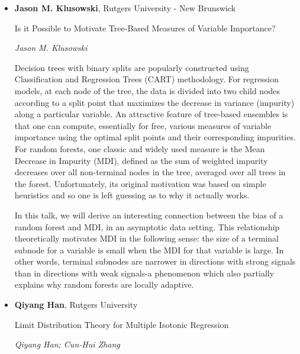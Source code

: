 \begin{itemize}
\item \textbf{Jason M. Klusowski}, Rutgers University - New Brunswick

Is it Possible to Motivate Tree-Based Measures of Variable Importance?

\emph{\footnotesize Jason M. Klusowski}

Decision trees with binary splits are popularly constructed using Classification and Regression Trees (CART) methodology. For regression models, at each node of the tree, the data is divided into two child nodes according to a split point that maximizes the decrease in variance (impurity) along a particular variable. An attractive feature of tree-based ensembles is that one can compute, essentially for free, various measures of variable importance using the optimal split points and their corresponding impurities. For random forests, one classic and widely used measure is the Mean Decrease in Impurity (MDI), defined as the sum of weighted impurity decreases over all non-terminal nodes in the tree, averaged over all trees in the forest. Unfortunately, its original motivation was based on simple heuristics and so one is left guessing as to why it actually works.

In this talk, we will derive an interesting connection between the bias of a random forest and MDI, in an asymptotic data setting. This relationship theoretically motivates MDI in the following sense: the size of a terminal subnode for a variable is small when the MDI for that variable is large. In other words, terminal subnodes are narrower in directions with strong signals than in directions with weak signals-a phenomenon which also partially explains why random forests are locally adaptive.

\item \textbf{Qiyang Han}, Rutgers University

Limit Distribution Theory for Multiple Isotonic Regression

\emph{\footnotesize Qiyang Han; Cun-Hui Zhang}


\end{itemize}
